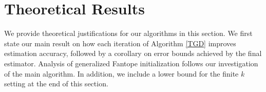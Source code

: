 \documentclass[11pt]{article}
\newcommand{\0}{{\mathbf{0}}}
\begin{document}
% 
%
% 



\section{Theoretical Results}
\label{sec:theorem}



We provide theoretical justifications for our algorithms in this section. 
We first state our main result on how each iteration of Algorithm \ref{TGD} improves estimation accuracy,
{followed by a corollary on error bounds achieved by the final estimator}. 
 Analysis of generalized Fantope initialization follows our investigation of the main algorithm.
In addition, we include a lower bound for the finite $k$ setting at the end of this section.
\end{document}
